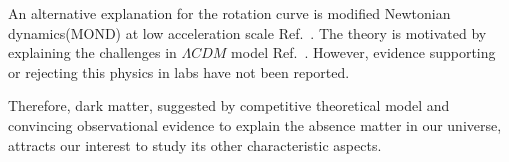 An alternative explanation for the rotation curve is modified Newtonian dynamics(MOND) at low acceleration scale Ref.~\cite{Milgrom1983, Milgrom1983a, Milgrom1983b}. The theory is motivated by explaining the challenges in $\Lambda CDM$ model Ref.~\cite{Famaey2012}. However, evidence supporting or rejecting this physics in labs have not been reported. 


Therefore, dark matter, suggested by competitive theoretical model and convincing observational evidence to explain the absence matter in our universe, attracts our interest to study its other characteristic aspects.